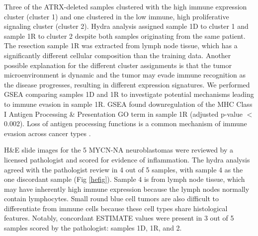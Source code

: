 \documentclass[10pt,letterpaper]{article}
\begin{document}
Three of the ATRX-deleted samples clustered with the high immune expression cluster (cluster 1) and one clustered in the low immune, high proliferative signaling cluster (cluster 2). Hydra analysis assigned sample 1D to cluster 1 and sample 1R to cluster 2 despite both samples originating from the same patient. The resection sample 1R was extracted from lymph node tissue, which has a significantly different cellular composition than the training data. Another possible explanation for the different cluster assignments is that the tumor microenvironment is dynamic and the tumor may evade immune recognition as the disease progresses, resulting in different expression signatures. We performed GSEA comparing samples 1D and 1R to investigate potential mechanisms leading to immune evasion in sample 1R. GSEA found downregulation of the MHC Class I Antigen Processing \& Presentation GO term in sample 1R (adjusted p-value $<$ 0.002). Loss of antigen processing functions is a common mechanism of immune evasion across cancer types \cite{reevesAntigenProcessingImmune2017}. 

H\&E slide images for the 5 MYCN-NA neuroblastomas were reviewed by a licensed pathologist and scored for evidence of inflammation. The hydra analysis agreed with the pathologist review in 4 out of 5 samples, with sample 4 as the one discordant sample (Fig \ref{hefig}). Sample 4 is from lymph node tissue, which may have inherently high immune expression because the lymph nodes normally contain lymphocytes. Small round blue cell tumors are also difficult to differentiate from immune cells because these cell types share histological features. Notably, concordant ESTIMATE values were present in 3 out of 5 samples scored by the pathologist: samples 1D, 1R, and 2. 
\end{document}
